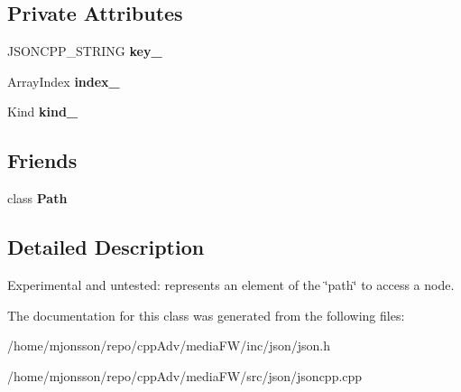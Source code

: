 \subsection*{Private Attributes}
\begin{DoxyCompactItemize}
\item 
\mbox{\label{classJson_1_1PathArgument_af4024368548ff730ef2bed97d6f1ca43}} 
J\+S\+O\+N\+C\+P\+P\+\_\+\+S\+T\+R\+I\+NG {\bfseries key\+\_\+}
\item 
\mbox{\label{classJson_1_1PathArgument_afd5857d1b6bfaae6961333bdae7bd5ec}} 
Array\+Index {\bfseries index\+\_\+}
\item 
\mbox{\label{classJson_1_1PathArgument_ad4bc4b544b155a3d9c7788572ecf991b}} 
Kind {\bfseries kind\+\_\+}
\end{DoxyCompactItemize}
\subsection*{Friends}
\begin{DoxyCompactItemize}
\item 
\mbox{\label{classJson_1_1PathArgument_a4877239a6b7f09fbf5a61ca68a49d74c}} 
class {\bfseries Path}
\end{DoxyCompactItemize}


\subsection{Detailed Description}
Experimental and untested\+: represents an element of the \char`\"{}path\char`\"{} to access a node. 

The documentation for this class was generated from the following files\+:\begin{DoxyCompactItemize}
\item 
/home/mjonsson/repo/cpp\+Adv/media\+F\+W/inc/json/json.\+h\item 
/home/mjonsson/repo/cpp\+Adv/media\+F\+W/src/json/jsoncpp.\+cpp\end{DoxyCompactItemize}
